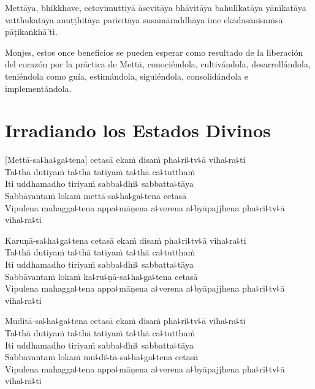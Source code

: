 Mettāya, bhikkhave, cetovimuttiyā āsevitāya bhāvitāya bahulīkatāya yānīkatāya vatthukatāya anuṭṭhitāya paricitāya susamāraddhāya ime ekādasānisaṁsā pāṭikaṅkhā'ti.

\begin{english}
  Monjes, estos once beneficios se pueden esperar como resultado de la liberación del corazón por la práctica de Mettā, conociéndola, cultivándola, desarrollándola, teniéndola como guía, estimándola, siguiéndola, consolidándola e implementándola.
\end{english}

\chapter*[Irradiando los Estados Divinos]{Irradiando los Estados Divinos}

\delegateSetUseNext


\begin{leader}
\end{leader}

[Mettā-sa꜕ha꜕ga꜕tena] cetasā ekaṁ disaṁ pha꜕ri꜕tv꜕ā viha꜕ra꜕ti\\
Ta꜕thā dutiyaṁ ta꜕thā tatiyaṁ ta꜕thā ca꜕tutthaṁ\\
Iti uddhamadho tiriyaṁ sabba꜕dhi꜕ sabbatta꜕tāya\\
Sabbāvantaṁ lokaṁ mettā-sa꜕ha꜕ga꜕tena cetasā\\
Vipulena mahagga꜕tena appa꜕māṇena a꜕verena a꜕byāpajjhena pha꜕ri꜕tv꜕ā viha꜕ra꜕ti

\enlargethispage{3\baselineskip}

Karuṇā-sa꜕ha꜕ga꜕tena cetasā ekaṁ disaṁ pha꜕ri꜕tv꜕ā viha꜕ra꜕ti\\
Ta꜕thā dutiyaṁ ta꜕thā tatiyaṁ ta꜕thā ca꜕tutthaṁ\\
Iti uddhamadho tiriyaṁ sabba꜕dhi꜕ sabbatta꜕tāya\\
Sabbāvantaṁ lokaṁ ka꜕ru꜕ṇā-sa꜕ha꜕ga꜕tena cetasā\\
Vipulena mahagga꜕tena appa꜕māṇena a꜕verena a꜕byāpajjhena pha꜕ri꜕tv꜕ā viha꜕ra꜕ti

Muditā-sa꜕ha꜕ga꜕tena cetasā ekaṁ disaṁ pha꜕ri꜕tv꜕ā viha꜕ra꜕ti\\
Ta꜕thā dutiyaṁ ta꜕thā tatiyaṁ ta꜕thā ca꜕tutthaṁ\\
Iti uddhamadho tiriyaṁ sabba꜕dhi꜕ sabbatta꜕tāya\\
Sabbāvantaṁ lokaṁ mu꜕di꜕tā-sa꜕ha꜕ga꜕tena cetasā\\
Vipulena mahagga꜕tena appa꜕māṇena a꜕verena a꜕byāpajjhena pha꜕ri꜕tv꜕ā viha꜕ra꜕ti

